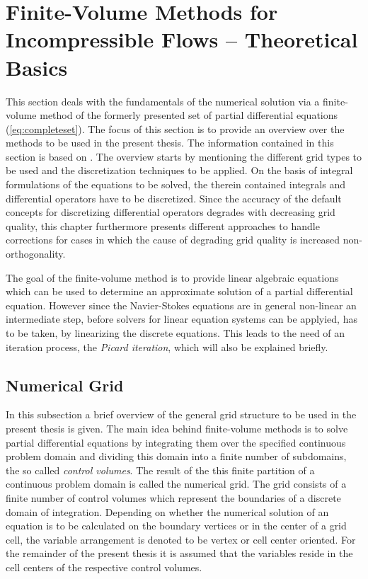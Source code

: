 \section{Finite-Volume Methods for Incompressible Flows -- Theoretical Basics}

This section deals with the fundamentals of the numerical solution via a finite-volume method of the formerly presented set of partial differential equations (\ref{eq:completeset}). The focus of this section is to provide an overview over the methods to be used in the present thesis. The information contained in this section is based on \cite{ferziger02,jasak96,schaefer99,muzaferja}. The overview starts by mentioning the different grid types to be used and the discretization techniques to be applied. On the basis of integral formulations of the equations to be solved, the therein contained integrals and differential operators have to be discretized. Since the accuracy of the default concepts for discretizing differential operators degrades with decreasing grid quality, this chapter furthermore presents different approaches to handle corrections for cases in which the cause of degrading grid quality is increased non-orthogonality. 
  
The goal of the finite-volume method is to provide linear algebraic equations which can be used to determine an approximate solution of a partial differential equation. However since the Navier-Stokes equations are in general non-linear an intermediate step, before solvers for linear equation systems can be applyied, has to be taken, by linearizing the discrete equations. This leads to the need of an iteration process, the \emph{Picard iteration}, which will also be explained briefly.
      
\subsection{Numerical Grid}

In this subsection a brief overview of the general grid structure to be used in the present thesis is given. The main idea behind finite-volume methods is to solve partial differential equations by integrating them over the specified continuous problem domain and dividing this domain into a finite number of subdomains, the so called \emph{control volumes}. The result of the this finite partition of a continuous problem domain is called the numerical grid. The grid consists of a finite number of control volumes which represent the boundaries of a discrete domain of integration. Depending on whether the numerical solution of an equation is to be calculated on the boundary vertices or in the center of a grid cell, the variable arrangement is denoted to be vertex or cell center oriented. For the remainder of the present thesis it is assumed that the variables reside in the cell centers of the respective control volumes.

